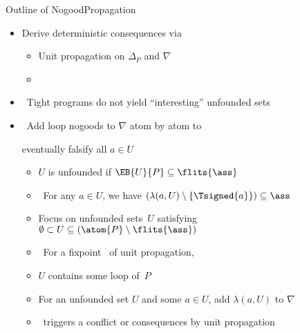 \begin{frame}{Outline of {NogoodPropagation}}
  \smallskip
  \begin{itemize}
  \item Derive deterministic consequences via
    \begin{itemize}\normalsize
    \item Unit propagation on $\Delta_P$ and $\nabla$
    \item \alert<4->{}
    \end{itemize}
    \smallskip
  \item<only@2-3>  \ Tight programs do not yield ``interesting'' unfounded sets
    \medskip
  \item<5->  \ Add loop nogoods to $\nabla$ atom by atom to
    \par
    eventually falsify all $a\in U$
    \medskip
    \begin{itemize}\normalsize
  \item<6-> $U$ is \alert{unfounded} if $\EB{U}{P}\subseteq\flits{\ass}$
  \item<7->[] \itarrow\ For any $a\in U$, we have $(\lambda(a,U)\setminus\{\Tsigned{a}\})\subseteq\ass$
    \smallskip
  \item<8-> Focus on unfounded sets~$U$ satisfying $\emptyset\subset U \subseteq (\atom{P}\setminus\flits{\ass})$
  \item<9->[] \itarrow\ For a fixpoint \ass\ of unit propagation,
  \item<9->[]\phantom{\itarrow}  $U$ contains some loop of~$P$
    \smallskip
  \item<10-> For an unfounded set $U$ and some $a\in U$, add $\lambda(a,U)$ to $\nabla$
  \item<11->[] \itarrow\ triggers a conflict or consequences by unit propagation
  \end{itemize}
\end{itemize}
\end{frame}
\begin{frame}[shrink=25]

\end{frame}
